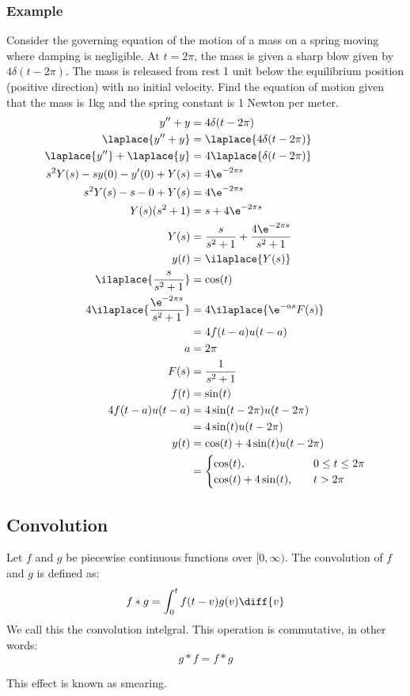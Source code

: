 \documentclass{math}
\begin{document}
\subsubsection*{Example}
Consider the governing equation of the motion of a mass on a spring moving where
damping is negligible. At \( t = 2\pi \), the mass is given a sharp blow given
by \( 4\delta(t-2\pi) \). The mass is released from rest 1 unit below the
equilibrium position (positive direction) with no initial velocity. Find the
equation of motion given that the mass is 1kg and the spring constant is 1
Newton per meter.
\begin{align*}
  y''+y &= 4\delta(t-2\pi) \\
  \laplace{y''+y} &= \laplace{4\delta(t-2\pi)} \\
  \laplace{y''}+\laplace{y} &= 4\laplace{\delta(t-2\pi)} \\
  s^2Y(s)-sy(0)-y'(0)+Y(s) &= 4\e^{-2\pi s} \\
  s^2Y(s)-s-0+Y(s) &= 4\e^{-2\pi s} \\
  Y(s)(s^2+1) &= s+4\e^{-2\pi s} \\
  Y(s) &= \frac{s}{s^2+1}+\frac{4\e^{-2\pi s}}{s^2+1} \\
  y(t) &= \ilaplace{Y(s)} \\
  \ilaplace{\frac{s}{s^2+1}} &= \cos(t) \\
  4\ilaplace{\frac{\e^{-2\pi s}}{s^2+1}} &= 4\ilaplace{\e^{-as}F(s)} \\
  &= 4f(t-a)u(t-a) \\
  a &= 2\pi \\
  F(s) &= \frac{1}{s^2+1} \\
  f(t) &= \sin(t) \\
  4f(t-a)u(t-a) &= 4\sin(t-2\pi)u(t-2\pi) \\
  &= 4\sin(t)u(t-2\pi) \\
  y(t) &= \cos(t)+4\sin(t)u(t-2\pi) \\
  &= \begin{cases}
    \cos(t), &\quad 0\le t\le 2\pi \\
    \cos(t)+4\sin(t), &\quad t>2\pi
  \end{cases}
\end{align*}

\subsection*{Convolution}
Let \( f \) and \( g \) be piecewise continuous functions over \( [0,\infty) \).
The convolution of \( f \) and \( g \) is defined as:
\[ f*g = \int_{0}^{t}f(t-v)g(v)\diff{v} \]
We call this the convolution intelgral. This operation is commutative, in other
words:
\[ g*f = f*g \]
\begin{center}
\end{center}
This effect is known as smearing.
\end{document}

